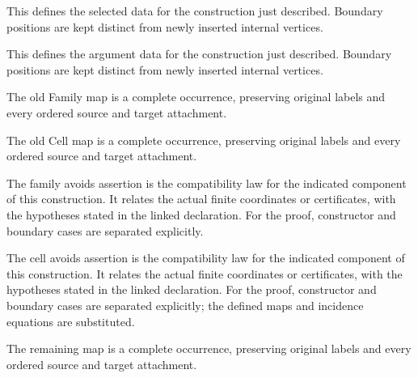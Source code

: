 This defines the selected data for the construction just described. Boundary positions are kept distinct from newly inserted internal vertices.
\par{}

This defines the argument data for the construction just described. Boundary positions are kept distinct from newly inserted internal vertices.
\par{}

The old Family map is a complete occurrence, preserving original labels and every ordered source and target attachment.
\par{}

The old Cell map is a complete occurrence, preserving original labels and every ordered source and target attachment.
\par{}

The family avoids assertion is the compatibility law for the indicated component of this construction. It relates the actual finite coordinates or certificates, with the hypotheses stated in the linked declaration.
For the proof, constructor and boundary cases are separated explicitly.
\par{}

The cell avoids assertion is the compatibility law for the indicated component of this construction. It relates the actual finite coordinates or certificates, with the hypotheses stated in the linked declaration.
For the proof, constructor and boundary cases are separated explicitly; the defined maps and incidence equations are substituted.
\par{}

The remaining map is a complete occurrence, preserving original labels and every ordered source and target attachment.
\par{}

